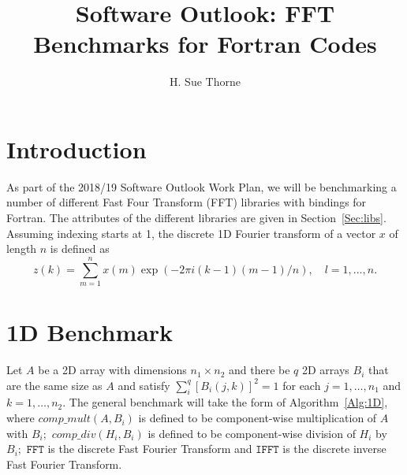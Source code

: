 \documentclass[a4]{article}
\begin{document}
\title{Software Outlook: FFT Benchmarks for Fortran Codes }
\author{H. Sue Thorne}

\maketitle


\section{Introduction}
As part of the 2018/19 Software Outlook Work Plan, we will be benchmarking 
a number of different Fast Four Transform (FFT) libraries with bindings for
Fortran. The attributes of the different libraries are given in 
Section~\ref{Sec:libs}. Assuming indexing starts at 1, the discrete 1D Fourier transform of a vector $x$ of length $n$ is defined as
\begin{equation}\label{Eqn:fft}
  z(k) = \sum_{m=1}^{n} x(m) \exp(-2\pi i (k-1) (m-1) / n), \quad l=1,\ldots,n.
\end{equation}


\section{1D Benchmark}
Let $A$ be a 2D array with dimensions $n_1\times n_2$ and there be $q$ 
2D arrays $B_i$ that are the same size as $A$ and satisfy 
$\sum_i^q \left[B_i(j,k)  \right]^2 = 1$ for each $j=1,\ldots,n_1$ and 
$k=1,\ldots,n_2.$  The general benchmark will take the form of 
Algorithm~\ref{Alg:1D}, where $comp\_mult(A,B_i)$ is defined to be 
component-wise multiplication of $A$ with $B_i;$  $comp\_div(H_i,B_i)$ 
is defined to be component-wise division of $H_i$ by $B_i;$ $\texttt{FFT}$ 
is the discrete Fast Fourier Transform and $\texttt{IFFT}$ is the 
discrete inverse Fast Fourier Transform.
\end{document}
